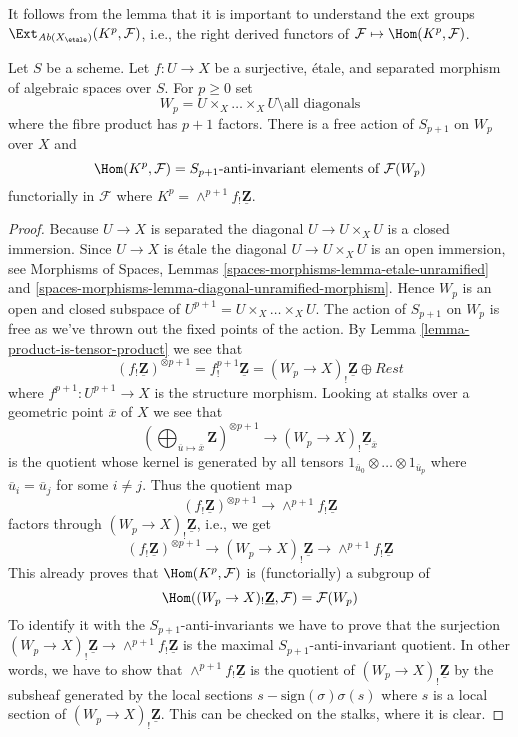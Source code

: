 \noindent
It follows from the lemma that it is important to understand the
ext groups $\Ext_{\textit{Ab}(X_\etale)}(K^p, \mathcal{F})$,
i.e., the right derived functors of
$\mathcal{F} \mapsto \Hom(K^p, \mathcal{F})$.

\begin{lemma}
\label{lemma-compute}
Let $S$ be a scheme. Let $f : U \to X$ be a surjective, \'etale, and separated
morphism of algebraic spaces over $S$. For $p \geq 0$ set
$$
W_p = U \times_X \ldots \times_X U \setminus \text{all diagonals}
$$
where the fibre product has $p + 1$ factors.
There is a free action of $S_{p + 1}$ on $W_p$ over $X$ and
$$
\Hom(K^p, \mathcal{F}) = S_{p + 1}\text{-anti-invariant elements of }
\mathcal{F}(W_p)
$$
functorially in $\mathcal{F}$ where
$K^p = \wedge^{p + 1}f_!\underline{\mathbf{Z}}$.
\end{lemma}

\begin{proof}
Because $U \to X$ is separated the diagonal $U \to U \times_X U$ is a
closed immersion. Since $U \to X$ is \'etale the diagonal
$U \to U \times_X U$ is an open immersion, see
Morphisms of Spaces, Lemmas
\ref{spaces-morphisms-lemma-etale-unramified} and
\ref{spaces-morphisms-lemma-diagonal-unramified-morphism}.
Hence $W_p$ is an open and closed subspace of
$U^{p + 1} = U \times_X \ldots \times_X U$. The action of $S_{p + 1}$
on $W_p$ is free as we've thrown out the fixed points of the action.
By
Lemma \ref{lemma-product-is-tensor-product}
we see that
$$
(f_!\underline{\mathbf{Z}})^{\otimes p + 1} =
f^{p + 1}_!\underline{\mathbf{Z}} = (W_p \to X)_!\underline{\mathbf{Z}}
\oplus Rest
$$
where $f^{p + 1} : U^{p + 1} \to X$ is the structure morphism.
Looking at stalks over a geometric point $\overline{x}$ of $X$
we see that
$$
\left(
\bigoplus\nolimits_{\overline{u} \mapsto \overline{x}} \mathbf{Z}
\right)^{\otimes p + 1}
\longrightarrow
(W_p \to X)_!\underline{\mathbf{Z}}_{\overline{x}}
$$
is the quotient whose kernel is generated by all tensors
$1_{\overline{u}_0} \otimes \ldots \otimes 1_{\overline{u}_p}$
where $\overline{u}_i = \overline{u}_j$ for some $i \not = j$.
Thus the quotient map
$$
(f_!\underline{\mathbf{Z}})^{\otimes p + 1}
\longrightarrow
\wedge^{p + 1}f_!\underline{\mathbf{Z}}
$$
factors through $(W_p \to X)_!\underline{\mathbf{Z}}$, i.e., we get
$$
(f_!\underline{\mathbf{Z}})^{\otimes p + 1}
\longrightarrow
(W_p \to X)_!\underline{\mathbf{Z}}
\longrightarrow
\wedge^{p + 1}f_!\underline{\mathbf{Z}}
$$
This already proves that $\Hom(K^p, \mathcal{F})$ is (functorially) a
subgroup of
$$
\Hom((W_p \to X)_!\underline{\mathbf{Z}}, \mathcal{F}) = \mathcal{F}(W_p)
$$
To identify it with the $S_{p + 1}$-anti-invariants we have to prove that
the surjection $(W_p \to X)_!\underline{\mathbf{Z}}
\to \wedge^{p + 1}f_!\underline{\mathbf{Z}}$ is the maximal
$S_{p + 1}$-anti-invariant quotient. In other words, we have to show that
$\wedge^{p + 1}f_!\underline{\mathbf{Z}}$ is the quotient of
$(W_p \to X)_!\underline{\mathbf{Z}}$ by the subsheaf generated by
the local sections $s - \text{sign}(\sigma)\sigma(s)$ where $s$ is
a local section of $(W_p \to X)_!\underline{\mathbf{Z}}$.
This can be checked on the stalks, where it is clear.
\end{proof}

